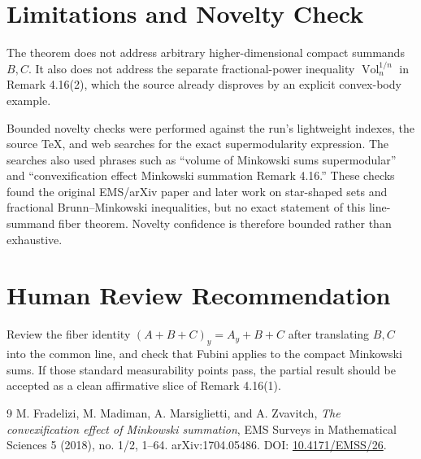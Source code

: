 \documentclass[11pt]{article}
\newcommand{\vol}{\operatorname{Vol}}
\begin{document}
\section*{Limitations and Novelty Check}

The theorem does not address arbitrary higher-dimensional compact summands
\(B,C\). It also does not address the separate fractional-power inequality
\(\vol_n^{1/n}\) in Remark 4.16(2), which the source already disproves by an
explicit convex-body example.

Bounded novelty checks were performed against the run's lightweight indexes,
the source TeX, and web searches for the exact supermodularity expression. The
searches also used phrases such as ``volume of Minkowski sums supermodular''
and ``convexification effect Minkowski summation Remark 4.16.'' These checks
found the original EMS/arXiv paper and later work on star-shaped sets and
fractional Brunn--Minkowski inequalities, but no exact statement of this
line-summand fiber theorem. Novelty confidence is therefore bounded rather than
exhaustive.

\section*{Human Review Recommendation}

Review the fiber identity
\((A+B+C)_y=A_y+B+C\) after translating \(B,C\) into the common line, and check
that Fubini applies to the compact Minkowski sums. If those standard measurability
points pass, the partial result should be accepted as a clean affirmative slice
of Remark 4.16(1).

\begin{thebibliography}{9}
M. Fradelizi, M. Madiman, A. Marsiglietti, and A. Zvavitch,
\emph{The convexification effect of Minkowski summation},
EMS Surveys in Mathematical Sciences 5 (2018), no. 1/2, 1--64.
arXiv:1704.05486. DOI:
\href{https://doi.org/10.4171/EMSS/26}{10.4171/EMSS/26}.
\end{thebibliography}
\end{document}
